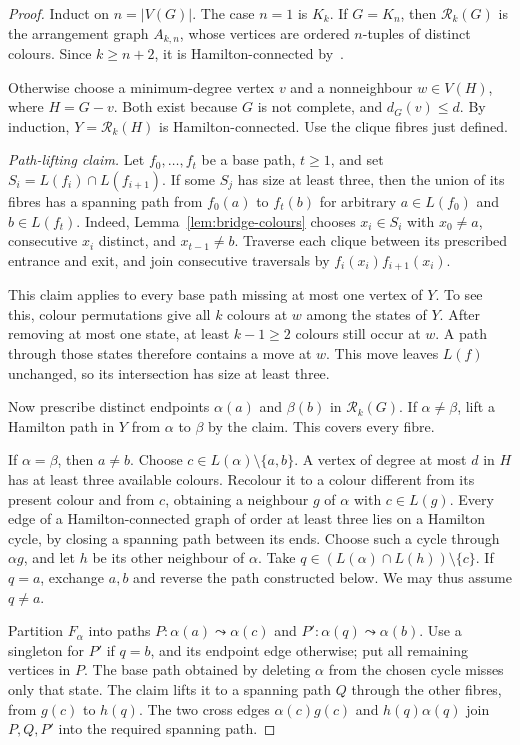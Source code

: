 \documentclass[11pt]{article}
\theoremstyle{remark}
\newcommand{\Rk}{\mathcal R_k}
\numberwithin{equation}{section}
\numberwithin{table}{section}
\begin{document}
\begin{proof}
Induct on $n=|V(G)|$. The case $n=1$ is $K_k$. If $G=K_n$,
then $\Rk(G)$ is the arrangement graph $A_{k,n}$, whose vertices
are ordered $n$-tuples of distinct colours. Since $k\ge n+2$,
it is Hamilton-connected by~\cite[Theorem~1]{HLTH04}.

Otherwise choose a minimum-degree vertex $v$ and a nonneighbour
$w\in V(H)$, where $H=G-v$. Both exist because $G$ is not complete,
and $d_G(v)\le d$. By induction, $Y=\Rk(H)$ is Hamilton-connected.
Use the clique fibres just defined.

\emph{Path-lifting claim.} Let $f_0,\ldots,f_t$ be a base path,
$t\ge1$, and set $S_i=L(f_i)\cap L(f_{i+1})$. If some $S_j$ has
size at least three, then the union of its fibres has a spanning
path from $f_0(a)$ to $f_t(b)$ for arbitrary
$a\in L(f_0)$ and $b\in L(f_t)$. Indeed,
Lemma~\ref{lem:bridge-colours} chooses $x_i\in S_i$ with
$x_0\ne a$, consecutive $x_i$ distinct, and $x_{t-1}\ne b$.
Traverse each clique between its prescribed entrance and exit,
and join consecutive traversals by $f_i(x_i)f_{i+1}(x_i)$.

This claim applies to every base path missing at most one vertex of
$Y$. To see this, colour permutations give all $k$ colours at $w$
among the states of $Y$. After removing at most one state, at least
$k-1\ge2$ colours still occur at $w$. A path through those states
therefore contains a move at $w$. This move leaves $L(f)$ unchanged,
so its intersection has size at least three.

Now prescribe distinct endpoints $\alpha(a)$ and $\beta(b)$ in
$\Rk(G)$. If $\alpha\ne\beta$, lift a Hamilton path in $Y$ from
$\alpha$ to $\beta$ by the claim. This covers every fibre.

If $\alpha=\beta$, then $a\ne b$. Choose
$c\in L(\alpha)\setminus\{a,b\}$. A vertex of degree at most $d$
in $H$ has at least three available colours. Recolour it to a colour
different from its present colour and from $c$, obtaining a neighbour
$g$ of $\alpha$ with $c\in L(g)$.
Every edge of a Hamilton-connected graph of order at least three lies
on a Hamilton cycle, by closing a spanning path between its ends.
Choose such a cycle through $\alpha g$, and let $h$ be its other
neighbour of $\alpha$. Take
$q\in(L(\alpha)\cap L(h))\setminus\{c\}$.
If $q=a$, exchange $a,b$ and reverse the path constructed below.
We may thus assume $q\ne a$.

Partition $F_\alpha$ into paths
$P:\alpha(a)\leadsto\alpha(c)$ and
$P':\alpha(q)\leadsto\alpha(b)$.
Use a singleton for $P'$ if $q=b$, and its endpoint edge otherwise;
put all remaining vertices in $P$. The base path obtained by deleting
$\alpha$ from the chosen cycle misses only that state. The claim lifts
it to a spanning path $Q$ through the other fibres, from $g(c)$ to
$h(q)$. The two cross edges $\alpha(c)g(c)$ and $h(q)\alpha(q)$
join $P,Q,P'$ into the required spanning path.
\end{proof}
\end{document}
